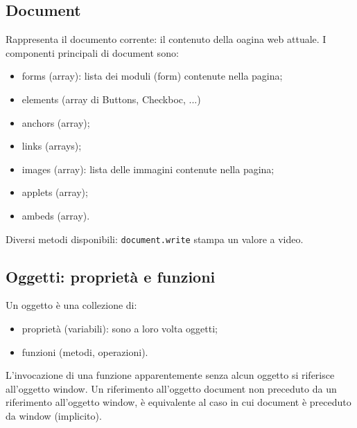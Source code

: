 \documentclass{article}
\begin{document}
\subsection{Document}
Rappresenta il documento corrente: il contenuto della oagina web attuale. I componenti principali di document sono:
\begin{itemize}
    \item forms (array): lista dei moduli (form) contenute nella pagina;
    \item elements (array di Buttons, Checkboc, ...)
    \item anchors (array);
    \item links (arrays);
    \item images (array): lista delle immagini contenute nella pagina;
    \item applets (array);
    \item ambeds (array).
\end{itemize}
Diversi metodi disponibili: \texttt{document.write} stampa un valore a video.
\subsection{Oggetti: proprietà e funzioni}
Un oggetto è una collezione di:
\begin{itemize}
    \item proprietà (variabili): sono a loro volta oggetti;
    \item funzioni (metodi, operazioni).
\end{itemize}
L'invocazione di una funzione apparentemente senza alcun oggetto si riferisce all'oggetto window. Un riferimento all'oggetto document non preceduto da un riferimento all'oggetto window, è equivalente al caso in cui document è preceduto da window (implicito).
\end{document}
